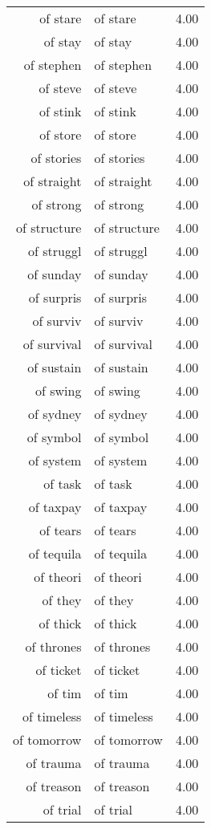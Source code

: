 \begin{table}[ht]
\begin{tabular}{rlr}
  of stare & of stare & 4.00 \\ 
  of stay & of stay & 4.00 \\ 
  of stephen & of stephen & 4.00 \\ 
  of steve & of steve & 4.00 \\ 
  of stink & of stink & 4.00 \\ 
  of store & of store & 4.00 \\ 
  of stories & of stories & 4.00 \\ 
  of straight & of straight & 4.00 \\ 
  of strong & of strong & 4.00 \\ 
  of structure & of structure & 4.00 \\ 
  of struggl & of struggl & 4.00 \\ 
  of sunday & of sunday & 4.00 \\ 
  of surpris & of surpris & 4.00 \\ 
  of surviv & of surviv & 4.00 \\ 
  of survival & of survival & 4.00 \\ 
  of sustain & of sustain & 4.00 \\ 
  of swing & of swing & 4.00 \\ 
  of sydney & of sydney & 4.00 \\ 
  of symbol & of symbol & 4.00 \\ 
  of system & of system & 4.00 \\ 
  of task & of task & 4.00 \\ 
  of taxpay & of taxpay & 4.00 \\ 
  of tears & of tears & 4.00 \\ 
  of tequila & of tequila & 4.00 \\ 
  of theori & of theori & 4.00 \\ 
  of they & of they & 4.00 \\ 
  of thick & of thick & 4.00 \\ 
  of thrones & of thrones & 4.00 \\ 
  of ticket & of ticket & 4.00 \\ 
  of tim & of tim & 4.00 \\ 
  of timeless & of timeless & 4.00 \\ 
  of tomorrow & of tomorrow & 4.00 \\ 
  of trauma & of trauma & 4.00 \\ 
  of treason & of treason & 4.00 \\ 
  of trial & of trial & 4.00 \\ 

\end{tabular}
\end{table}
